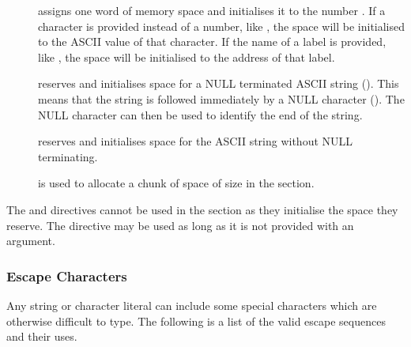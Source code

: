 \begin{description}

\item[\word {}] assigns one word of memory space and initialises it to
the number .
If a character is provided instead of a number, like , the space
will be initialised to the ASCII value of that character.
If the name of a label is provided, like , the space will be
initialised to the address of that label.

\item[\asciiz {}] reserves and initialises space 
for a NULL terminated ASCII string ().
This means that the string is followed immediately by a NULL
character (). The NULL character can then be used
to identify the end of the string.

\item[\ascii {}] reserves and initialises space for 
the ASCII string  without NULL terminating.

\item[\Space {}] is used to allocate a chunk of space 
of size  in the \bss section.

\end{description}

The \ascii and \asciiz directives cannot be used in the \bss section
as they initialise the space they reserve. The \word directive may be
used as long as it is not provided with an argument.

\subsubsection{Escape Characters}

Any string or character literal can include some special characters which
are otherwise difficult to type. The following is a list of the valid
escape sequences and their uses.

